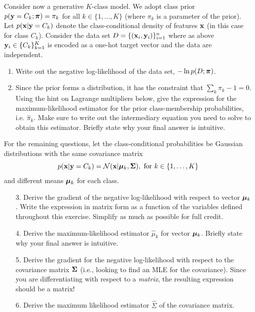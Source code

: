 \documentclass[submit]{harvardml}
\begin{document}
\begin{problem}

  Consider now a generative $K$-class model.  We adopt class prior
  $p(\mathbf{y} = C_k; \boldsymbol{\pi}) = \pi_k$ for all $k \in \{1, \ldots, K\}$
(where $\pi_k$ is a parameter of the prior).
Let  $p(\mathbf{x}|\mathbf{y}=C_k)$ denote
the class-conditional density of features $\mathbf{x}$ (in this
case for class $C_k$). Consider the data set $D = \{(\mathbf{x}_i,
\mathbf{y}_i)\}_{i=1}^n$ where as above $\mathbf{y}_i \in \{C_k\}_{k=1}^K$ is
encoded as a one-hot target vector and the data are independent.

\begin{enumerate}
  \item Write out the negative log-likelihood of the data set, $-\ln p(D ; \boldsymbol{\pi})$.

  \item Since the prior forms a distribution, it has the constraint that
    $\sum_k\pi_k - 1 = 0$.  Using the hint on
Lagrange multipliers below, give the
    expression for the maximum-likelihood estimator for the prior
    class-membership probabilities, i.e.
    $\hat \pi_k.$
    Make sure to write out the intermediary equation you need
    to solve to obtain this estimator. Briefly state why your final answer is intuitive.
\end{enumerate}

    For the remaining questions, let the
    class-conditional probabilities be Gaussian distributions with
the same covariance matrix
    $$p(\mathbf{x} | \mathbf{y} = C_k) = \mathcal{N}(\mathbf{x} |  \boldsymbol{\mu}_k, \mathbf{\Sigma}), \text{\ for\ }k \in \{1,\ldots, K\}$$
    and different means $\boldsymbol{\mu}_k$ for each class.

    \begin{enumerate}
  \item[3.] Derive the gradient of the negative log-likelihood with respect to vector $\boldsymbol{\mu}_k$.
    Write the expression in matrix form as a function of the variables defined
    throughout this exercise. Simplify as much as possible for full credit.
  \item[4.] Derive the maximum-likelihood estimator $\hat{\mu}_k$ for vector $\boldsymbol{\mu}_k$. Briefly state why your final answer is intuitive.
  \item[5.] Derive the gradient for the negative log-likelihood with respect to the
    covariance matrix $\mathbf{\Sigma}$ (i.e., looking
to find an MLE for the covariance).
Since you are differentiating with respect to a
    \emph{matrix}, the resulting expression should be a matrix!
%
  \item[6.] Derive the maximum likelihood estimator $\hat{\Sigma}$ of the covariance matrix.
\end{enumerate}


\end{problem}
\end{document}

